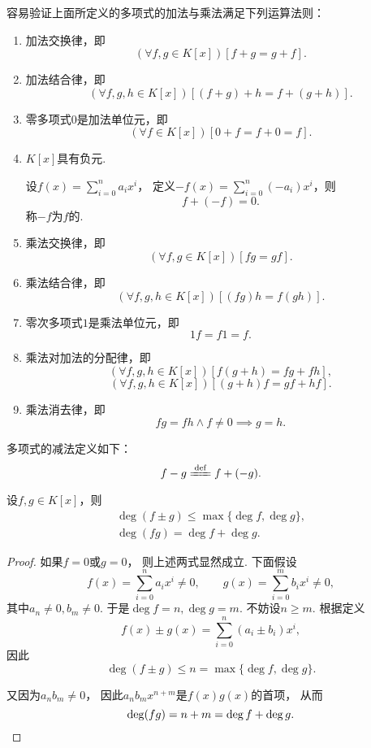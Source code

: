 容易验证上面所定义的多项式的加法与乘法满足下列运算法则：
\begin{enumerate}
	\item 加法交换律，即\[
		(\forall f,g \in K[x])[f+g=g+f].
	\]

	\item 加法结合律，即\[
		(\forall f,g,h \in K[x])[(f+g)+h=f+(g+h)].
	\]

	\item 零多项式\(0\)是加法单位元，即\[
		(\forall f \in K[x])[0+f=f+0=f].
	\]

	\item \(K[x]\)具有负元.

	设\(f(x)=\sum_{i=0}^n a_i x^i\)，
	定义\(-f(x)=\sum_{i=0}^n (-a_i) x^i\)，则\[
		f+(-f)=0.
	\]
	称\(-f\)为\(f\)的.

	\item 乘法交换律，即\[
		(\forall f,g \in K[x])[fg=gf].
	\]

	\item 乘法结合律，即\[
		(\forall f,g,h \in K[x])[(fg)h=f(gh)].
	\]

	\item 零次多项式\(1\)是乘法单位元，即\[
		1f=f1=f.
	\]

	\item 乘法对加法的分配律，即\[
		(\forall f,g,h \in K[x])[f(g+h)=fg+fh],
	\]\[
		(\forall f,g,h \in K[x])[(g+h)f=gf+hf].
	\]

	\item 乘法消去律，即\[
		fg=fh \land f\neq0 \implies g=h.
	\]
\end{enumerate}

多项式的减法定义如下：\begin{equation}
	f-g \defeq f+(-g).
\end{equation}

\begin{proposition}
设\(f,g \in K[x]\)，则\begin{gather}
	\deg(f \pm g) \leq \max\{\deg f, \deg g\}, \\
	\deg(fg) = \deg f + \deg g.
\end{gather}
\begin{proof}
如果\(f=0\)或\(g=0\)，
则上述两式显然成立.
下面假设\[
	f(x)
	= \sum_{i=0}^n a_i x^i
	\neq0, \qquad
	g(x)
	= \sum_{i=0}^m b_i x^i
	\neq0,
\]
其中\(a_n\neq0,b_m\neq0\).
于是\(\deg f=n,
\deg g=m\).
不妨设\(n \geq m\).
根据定义\[
	f(x) \pm g(x)
	= \sum_{i=0}^n (a_i \pm b_i) x^i,
\]
因此\[
	\deg(f \pm g)
	\leq n
	= \max\{
		\deg f,
		\deg g
	\}.
\]

又因为\(a_n b_m \neq 0\)，
因此\(a_n b_m x^{n+m}\)是\(f(x) g(x)\)的首项，
从而\[
	\deg(fg) = n+m = \deg f + \deg g.
	\qedhere
\]
\end{proof}
\end{proposition}

